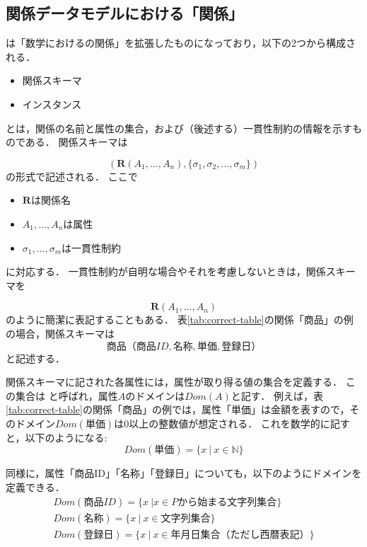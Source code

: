 \subsection{関係データモデルにおける「関係」}
は「数学におけるの関係」を拡張したものになっており，以下の2つから構成される．
\begin{itemize}
\item 関係スキーマ
\item インスタンス
\end{itemize}

 とは，関係の名前と属性の集合，および（後述する）一貫性制約の情報を示すものである．
関係スキーマは

\begin{equation}
(\boldsymbol{R}(A_1, ..., A_n), \{\sigma_1, \sigma_2, ..., \sigma_m\})
\end{equation}
の形式で記述される．
ここで
\begin{itemize}
\item $\boldsymbol{R}$は関係名
\item $A_1, ..., A_n$は属性
\item $\sigma_1, ..., \sigma_m$は一貫性制約
\end{itemize}
に対応する．
一貫性制約が自明な場合やそれを考慮しないときは，関係スキーマを

\begin{equation}
\boldsymbol{R}(A_1, ..., A_n)
\end{equation}
のように簡潔に表記することもある．
表\ref{tab:correct-table}の関係「商品」の例の場合，関係スキーマは
\begin{equation}
商品（商品ID, 名称, 単価, 登録日）
\end{equation}
と記述する．

関係スキーマに記された各属性には，属性が取り得る値の集合を定義する．
この集合は と呼ばれ，属性$A$のドメインは$Dom(A)$と記す．
例えば，表\ref{tab:correct-table}の関係「商品」の例では，属性「単価」は金額を表すので，そのドメイン$Dom(単価)$は0以上の整数値が想定される．
これを数学的に記すと，以下のようになる:
\begin{equation}
Dom(単価) = \{ x \ | \ x \in \mathbb{N} \}
\end{equation}

同様に，属性「商品ID」「名称」「登録日」についても，以下のようにドメインを定義できる．
\begin{eqnarray}
Dom(商品ID) = \{ x \ | x \in Pから始まる文字列集合 \} \\
Dom(名称) = \{ x \ | \ x \in 文字列集合 \} \\
Dom(登録日) = \{ x \ | \ x \in 年月日集合（ただし西暦表記） \}
\end{eqnarray}


